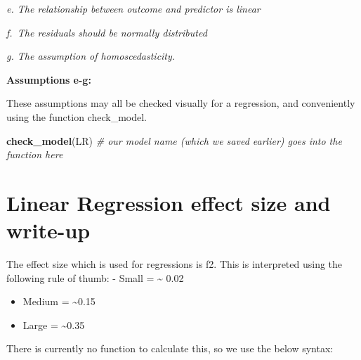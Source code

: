 \documentclass[
]{book}
\newenvironment{Shaded}{\begin{snugshade}}{\end{snugshade}}
\newcommand{\AttributeTok}[1]{\textcolor[rgb]{0.13,0.29,0.53}{#1}}
\newcommand{\CommentTok}[1]{\textcolor[rgb]{0.56,0.35,0.01}{\textit{#1}}}
\newcommand{\DecValTok}[1]{\textcolor[rgb]{0.00,0.00,0.81}{#1}}
\newcommand{\FunctionTok}[1]{\textcolor[rgb]{0.13,0.29,0.53}{\textbf{#1}}}
\newcommand{\NormalTok}[1]{#1}
\newcommand{\OtherTok}[1]{\textcolor[rgb]{0.56,0.35,0.01}{#1}}
\newcommand{\SpecialCharTok}[1]{\textcolor[rgb]{0.81,0.36,0.00}{\textbf{#1}}}
\begin{document}
\begin{Shaded}
\end{Shaded}

\emph{e. The relationship between outcome and predictor is linear}

\emph{f.~The residuals should be normally distributed}

\emph{g. The assumption of homoscedasticity.}

\textbf{Assumptions e-g:}

These assumptions may all be checked visually for a regression, and conveniently using the function check\_model.

\begin{Shaded}
\begin{Highlighting}[]
\FunctionTok{check\_model}\NormalTok{(LR) }\CommentTok{\# our model name (which we saved earlier) goes into the function here}
\end{Highlighting}
\end{Shaded}

\section{Linear Regression effect size and write-up}\label{linear-regression-effect-size-and-write-up}

The effect size which is used for regressions is f2. This is interpreted using the following rule of thumb: - Small = \textasciitilde{} 0.02

\begin{itemize}
\item
  Medium = \textasciitilde0.15
\item
  Large = \textasciitilde0.35
\end{itemize}

There is currently no function to calculate this, so we use the below syntax:

\begin{Shaded}
\end{Shaded}
\end{document}
